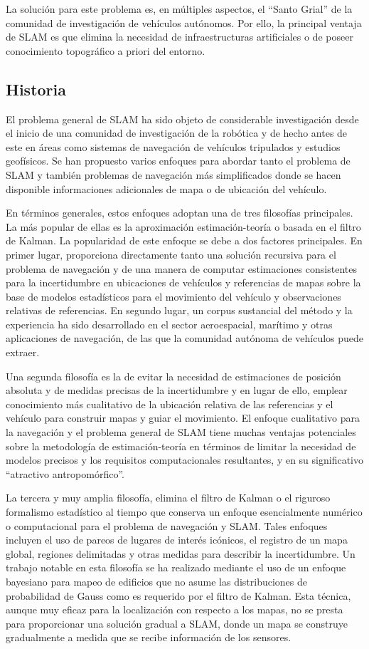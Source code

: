 La solución para este problema es, en múltiples aspectos, el ``Santo Grial'' de la comunidad de investigación de vehículos autónomos. Por ello, la principal ventaja de SLAM es que elimina la necesidad de infraestructuras artificiales o de poseer conocimiento topográfico a priori del entorno.

\subsection{Historia}
El problema general de SLAM ha sido objeto de considerable investigación desde el inicio de una comunidad de investigación de la robótica y de hecho antes de este en áreas como sistemas de navegación de vehículos tripulados y estudios geofísicos. Se han propuesto varios enfoques para abordar tanto el problema de SLAM y también problemas de navegación más simplificados donde se hacen disponible informaciones adicionales de mapa o de ubicación del vehículo.

En términos generales, estos enfoques adoptan una de tres filosofías principales. La más popular de ellas es la aproximación estimación-teoría o basada en el filtro de Kalman. La popularidad de este enfoque se debe a dos factores principales. En primer lugar, proporciona directamente tanto una solución recursiva para el problema de navegación y de una manera de computar estimaciones consistentes para la incertidumbre en ubicaciones de vehículos y referencias de mapas sobre la base de modelos estadísticos para el movimiento del vehículo y observaciones relativas de referencias. En segundo lugar, un corpus sustancial del método y la experiencia ha sido desarrollado en el sector aeroespacial, marítimo y otras aplicaciones de navegación, de las que la comunidad autónoma de vehículos puede extraer.

Una segunda filosofía es la de evitar la necesidad de estimaciones de posición absoluta y de medidas precisas de la incertidumbre y en lugar de ello, emplear conocimiento más cualitativo de la ubicación relativa de las referencias y el vehículo para construir mapas y guiar el movimiento. El enfoque cualitativo para la navegación y el problema general de SLAM tiene muchas ventajas potenciales sobre la metodología de estimación-teoría en términos de limitar la necesidad de modelos precisos y los requisitos computacionales resultantes, y en su significativo ``atractivo antropomórfico''.

La tercera y muy amplia filosofía, elimina el filtro de Kalman o el riguroso formalismo estadístico al tiempo que conserva un enfoque esencialmente numérico o computacional para el problema de navegación y SLAM. Tales enfoques incluyen el uso de pareos de lugares de interés icónicos, el registro de un mapa global, regiones delimitadas y otras medidas para describir la incertidumbre. Un trabajo notable en esta filosofía se ha realizado mediante el uso de un enfoque bayesiano para mapeo de edificios que no asume las distribuciones de probabilidad de Gauss como es requerido por el filtro de Kalman. Esta técnica, aunque muy eficaz para la localización con respecto a los mapas, no se presta para proporcionar una solución gradual a SLAM, donde un mapa se construye gradualmente a medida que se recibe información de los sensores.
\cite{dissanayake01solution}

